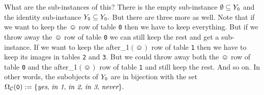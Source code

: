 \documentclass[CT4S-EN-RU]{subfiles}
\begin{document}
\begin{exampleENG}
What are the sub-instances of this? There is the empty sub-instance $\emptyset\ss Y_{\tt 0}$ and the identity sub-instance $Y_{\tt 0}\ss Y_{\tt 0}.$ But there are three more as well. Note that if we want to keep the $\smiley$ row of table {\tt 0} then we have to keep everything. But if we throw away the $\smiley$ row of table {\tt 0} we can still keep the rest and get a sub-instance. If we want to keep the after\_1$(\smiley)$ row of table {\tt 1} then we have to keep its images in tables {\tt 2} and {\tt 3}. But we could throw away both the $\smiley$ row of table {\tt 0} and the after\_1$(\smiley)$ row of table {\tt 1} and still keep the rest. And so on. In other words, the subobjects of $Y_{\tt 0}$ are in bijection with the set $\Omega_\mcC({\tt 0}):=\{\tn{{\it yes}, {\it in 1}, {\it in 2}, {\it in 3}, {\it never}}\}.$ 


\end{exampleENG}
\end{document}
